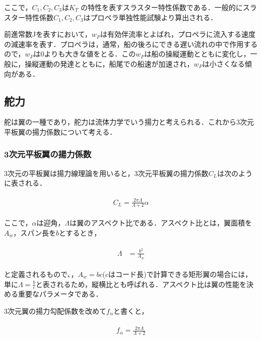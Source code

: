 ここで，$C_1,C_2,C_3$は$K_T$ の特性を表すスラスター特性係数である．一般的にスラスター特性係数$C_1,C_2,C_3$はプロペラ単独性能試験より算出される．

前進常数Jを表すにおいて，$w_P$は有効伴流率とよばれ，プロペラに流入する速度の減速率を表す．プロペラは，通常，船の後ろにできる遅い流れの中で作用するので，$w_P$は0よりも大きな値をとる．この$w_P$は船の操縦運動とともに変化し，一般に，操縦運動の発達とともに，船尾での船速が加速され，$w_P$は小さくなる傾向がある．

\subsection{舵力}

舵は翼の一種であり，舵力は流体力学でいう揚力と考えられる．これから3次元平板翼の揚力係数について考える．

\subsubsection{3次元平板翼の揚力係数}
3次元の平板翼は揚力線理論を用いると，3次元平板翼の揚力係数$C_L$は次のように表される．

\begin{align}
    \begin{split}
        C_{L}=\frac{2 \pi \Lambda}{\Lambda+2} \alpha \label{eq:2-31}
    \end{split}
\end{align}

ここで，$\alpha$は迎角，$\Lambda$は翼のアスペクト比である．アスペクト比とは，翼面積を$A_w$，スパン長を$b$とするとき，

\begin{align}
    \begin{split}
        \Lambda &= \frac{b^2}{A_w} \label{eq:2-32}
    \end{split}
\end{align}

と定義されるもので、，$A_w=b c$($c$はコード長)で計算できる矩形翼の場合には，単に$\Lambda=\frac{b}{c}$と表されるため，縦横比とも呼ばれる．アスペクト比は翼の性能を決める重要なパラメータである．

3次元翼の揚力勾配係数を改めて$f_{\alpha}$と書くと，

\begin{align}
    \begin{split}
        f_{\alpha}=\frac{2 \pi \Lambda}{\Lambda+2} \label{eq:2-33}
    \end{split}
\end{align}

